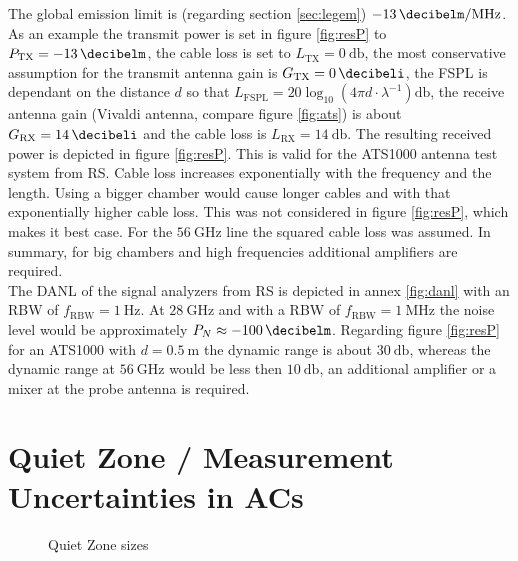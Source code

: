 The global emission limit is (regarding section \ref{sec:legem}) $\SI{-13}{\decibelm\per\mega\hertz}$. As an example the transmit power is set in figure \ref{fig:resP} to $P_{\text{TX}}=\SI{-13}{\decibelm}$, the cable loss is set to $L_{\text{TX}} = \SI{0}{\decibel}$, the most conservative assumption for the transmit antenna gain is $ G_{\text{TX}} = \SI{0}{\decibeli}$, the \ac{FSPL} is dependant on the distance $d$ so that $L_{\text{FSPL}} = 20\log_{10}\left(4\pi d \cdot\lambda^{-1}\right)\si{\decibel}$, the receive antenna gain (Vivaldi antenna, compare figure \ref{fig:ats}) is about $ G_{\text{RX}} = \SI{14}{\decibeli}$ and the cable loss is $L_{\text{RX}}=\SI{14}{\decibel}$. The resulting received power is depicted in figure \ref{fig:resP}. This is valid for the ATS1000 antenna test system from \ac{RS}. Cable loss increases exponentially with the frequency and the length. Using a bigger chamber would cause longer cables and with that exponentially higher cable loss. This was not considered in figure \ref{fig:resP}, which makes it best case. For the $\SI{56}{\giga\hertz}$ line the squared cable loss was assumed. In summary, for big chambers and high frequencies additional amplifiers are required.\\
The \ac{DANL} of the signal analyzers from \ac{RS} is depicted in annex \ref{fig:danl} with an \ac{RBW} of $f_{\text{RBW}}=\SI{1}{\hertz}$. At $\SI{28}{\giga\hertz}$ and with a \ac{RBW} of $f_{\text{RBW}}=\SI{1}{\mega\hertz}$ the noise level would be approximately $P_N \approx \SI{-100}{\decibelm}$. Regarding figure \ref{fig:resP} for an ATS1000 with $d=\SI{0.5}{\meter}$ the dynamic range is about $\SI{30}{\decibel}$, whereas the dynamic range at $\SI{56}{\giga\hertz}$ would be less then $\SI{10}{\decibel}$, an additional amplifier or a mixer at the probe antenna is required.

\section{Quiet Zone / Measurement Uncertainties in ACs}

\begin{figure}[h]
  \centering
  \centering
\caption{Quiet Zone sizes}
\label{fig:qz}
\end{figure}

